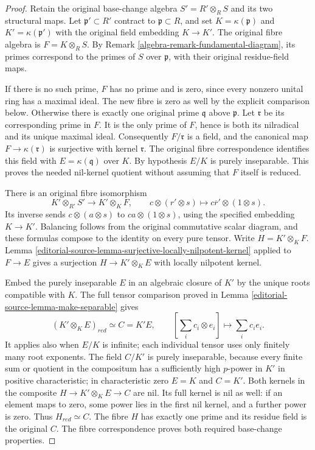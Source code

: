 \begin{proof}
Retain the original base-change algebra
$S'=R'\otimes_R S$ and its two structural
maps. Let $\mathfrak p'\subset R'$ contract
to $\mathfrak p\subset R$, and set
$K=\kappa(\mathfrak p)$ and
$K'=\kappa(\mathfrak p')$ with the original
field embedding $K\to K'$. The original
fibre algebra is $F=K\otimes_R S$.
By Remark \ref{algebra-remark-fundamental-diagram},
its primes correspond to the primes
of $S$ over $\mathfrak p$, with their
original residue-field maps.

If there is no such prime, $F$ has
no prime and is zero, since every
nonzero unital ring has a maximal
ideal. The new fibre is zero as
well by the explicit comparison
below. Otherwise there is exactly
one original prime $\mathfrak q$
above $\mathfrak p$. Let $\mathfrak r$
be its corresponding prime in $F$.
It is the only prime of $F$, hence
is both its nilradical and its
unique maximal ideal. Consequently
$F/\mathfrak r$ is a field, and
the canonical map $F\to\kappa(\mathfrak r)$
is surjective with kernel $\mathfrak r$.
The original fibre correspondence
identifies this field with
$E=\kappa(\mathfrak q)$ over $K$.
By hypothesis $E/K$ is purely
inseparable. This proves the
needed nil-kernel quotient without
assuming that $F$ itself is reduced.

There is an original fibre isomorphism
$$
K'\otimes_{R'} S'\longrightarrow
K'\otimes_K F,\qquad
c\otimes(r'\otimes s)\longmapsto
c\overline r'\otimes(1\otimes s).
$$
Its inverse sends
$c\otimes(a\otimes s)$ to
$ca\otimes(1\otimes s)$, using the
specified embedding $K\to K'$.
Balancing follows from the original
commutative scalar diagram, and
these formulas compose to the
identity on every pure tensor.
Write $H=K'\otimes_K F$.
Lemma \ref{editorial-source-lemma-surjective-locally-nilpotent-kernel}
applied to $F\to E$ gives a
surjection
$H\to K'\otimes_K E$ with locally
nilpotent kernel.

Embed the purely inseparable $E$
in an algebraic closure of $K'$
by the unique roots compatible
with $K$. The full tensor comparison
proved in Lemma \ref{editorial-source-lemma-make-separable}
gives
$$
(K'\otimes_K E)_{red}\simeq C=K'E,
\qquad [\sum_i c_i\otimes e_i]
\longmapsto\sum_i c_i e_i.
$$
It applies also when $E/K$ is
infinite; each individual tensor
uses only finitely many root
exponents. The field $C/K'$ is
purely inseparable, because every
finite sum or quotient in the
compositum has a sufficiently high
$p$-power in $K'$ in positive
characteristic; in characteristic
zero $E=K$ and $C=K'$.
Both kernels in the composite
$H\to K'\otimes_K E\to C$ are nil.
Its full kernel is nil as well:
if an element maps to zero, some
power lies in the first nil kernel,
and a further power is zero.
Thus $H_{red}\simeq C$. The fibre
$H$ has exactly one prime and its
residue field is the original $C$.
The fibre correspondence proves
both required base-change properties.


\end{proof}
